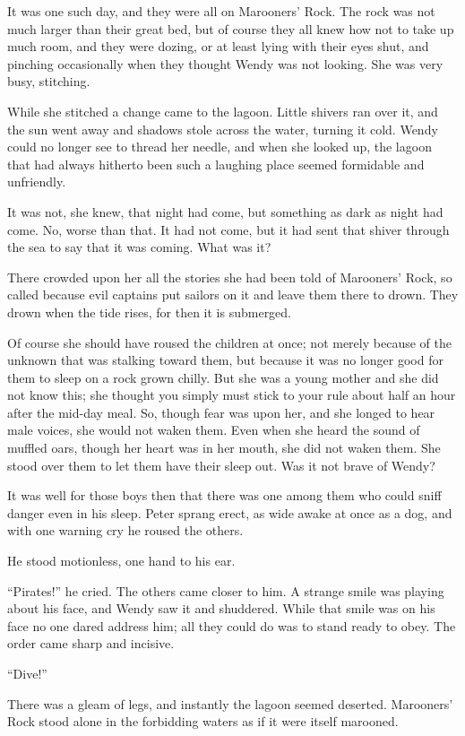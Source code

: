It was one such day, and they were all on Marooners' Rock. The rock was
not much larger than their great bed, but of course they all knew how
not to take up much room, and they were dozing, or at least lying with
their eyes shut, and pinching occasionally when they thought Wendy was
not looking. She was very busy, stitching.

While she stitched a change came to the lagoon. Little shivers ran over
it, and the sun went away and shadows stole across the water, turning
it cold. Wendy could no longer see to thread her needle, and when she
looked up, the lagoon that had always hitherto been such a laughing
place seemed formidable and unfriendly.

It was not, she knew, that night had come, but something as dark as
night had come. No, worse than that. It had not come, but it had sent
that shiver through the sea to say that it was coming. What was it?

There crowded upon her all the stories she had been told of Marooners'
Rock, so called because evil captains put sailors on it and leave them
there to drown. They drown when the tide rises, for then it is
submerged.

Of course she should have roused the children at once; not merely
because of the unknown that was stalking toward them, but because it
was no longer good for them to sleep on a rock grown chilly. But she
was a young mother and she did not know this; she thought you simply
must stick to your rule about half an hour after the mid-day meal. So,
though fear was upon her, and she longed to hear male voices, she would
not waken them. Even when she heard the sound of muffled oars, though
her heart was in her mouth, she did not waken them. She stood over them
to let them have their sleep out. Was it not brave of Wendy?

It was well for those boys then that there was one among them who could
sniff danger even in his sleep. Peter sprang erect, as wide awake at
once as a dog, and with one warning cry he roused the others.

He stood motionless, one hand to his ear.

``Pirates!'' he cried. The others came closer to him. A strange smile was
playing about his face, and Wendy saw it and shuddered. While that
smile was on his face no one dared address him; all they could do was
to stand ready to obey. The order came sharp and incisive.

``Dive!''

There was a gleam of legs, and instantly the lagoon seemed deserted.
Marooners' Rock stood alone in the forbidding waters as if it were
itself marooned.

